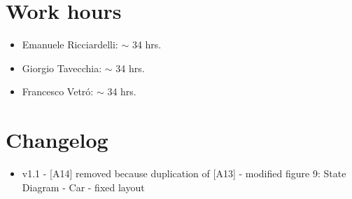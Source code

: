 \documentclass[10pt, a4paper,titlepage]{article}
\begin{document}
\section*{Work hours} 
\begin{itemize}
\item Emanuele Ricciardelli: $\sim$ 34 hrs.
\item Giorgio Tavecchia: $\sim$ 34 hrs.
\item Francesco Vetr\'o: $\sim$ 34 hrs.
\end{itemize}
\section*{Changelog}
\begin{itemize}
\item v1.1
\subitem - [A14] removed because duplication of [A13]
\subitem - modified figure 9: State Diagram - Car
\subitem - fixed layout
\end{itemize}
\end{document}
